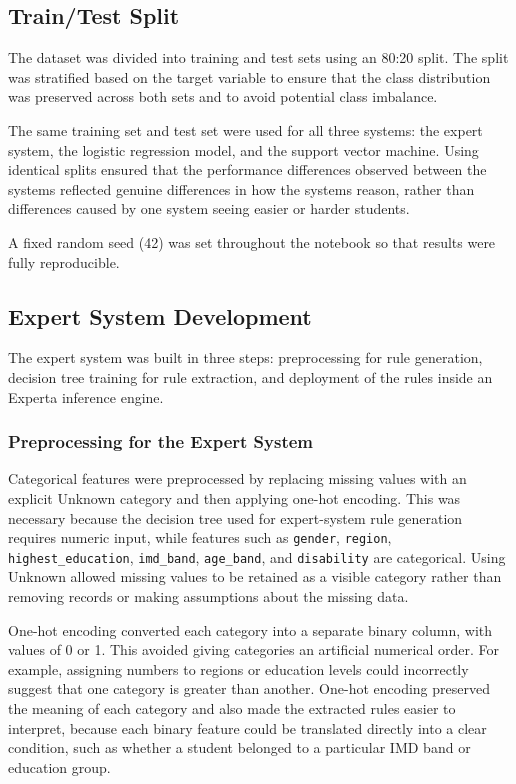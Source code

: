 \subsection{Train/Test Split}

The dataset was divided into training and test sets using an 80:20 split. The split was stratified based on the target variable to ensure that the class distribution was preserved across both sets and to avoid potential class imbalance.

The same training set and test set were used for all three systems: the expert system, the logistic regression model, and the support vector machine. Using identical splits ensured that the performance differences observed between the systems reflected genuine differences in how the systems reason, rather than differences caused by one system seeing easier or harder students.

A fixed random seed (42) was set throughout the notebook so that results were fully reproducible.

\subsection{Expert System Development}

The expert system was built in three steps: preprocessing for rule generation, decision tree training for rule extraction, and deployment of the rules inside an Experta inference engine.

\subsubsection{Preprocessing for the Expert System}

Categorical features were preprocessed by replacing missing values with an explicit Unknown category and then applying one-hot encoding. This was necessary because the decision tree used for expert-system rule generation requires numeric input, while features such as \texttt{gender}, \texttt{region}, \texttt{highest\_education}, \texttt{imd\_band}, \texttt{age\_band}, and \texttt{disability} are categorical. Using Unknown allowed missing values to be retained as a visible category rather than removing records or making assumptions about the missing data.

One-hot encoding converted each category into a separate binary column, with values of 0 or 1. This avoided giving categories an artificial numerical order. For example, assigning numbers to regions or education levels could incorrectly suggest that one category is greater than another. One-hot encoding preserved the meaning of each category and also made the extracted rules easier to interpret, because each binary feature could be translated directly into a clear condition, such as whether a student belonged to a particular IMD band or education group.

